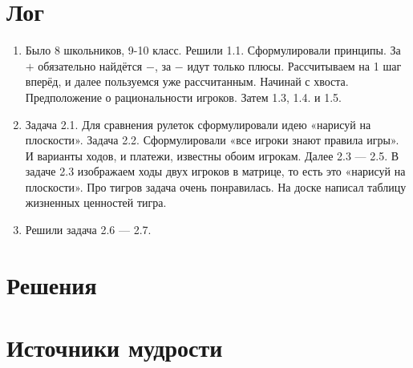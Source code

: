 \documentclass[12pt]{article}
\newcounter{problem}[section]
\begin{document}
\section{Лог}

\begin{enumerate}
  \item Было 8 школьников, 9-10 класс. Решили 1.1. Сформулировали принципы.
  За $+$ обязательно найдётся $-$, за $-$ идут только плюсы.
  Рассчитываем на 1 шаг вперёд, и далее пользуемся уже рассчитанным.
  Начинай с хвоста. Предположение о рациональности игроков.  Затем 1.3, 1.4. и 1.5.
  \item Задача 2.1. Для сравнения рулеток сформулировали идею «нарисуй на плоскости».
  Задача 2.2. Сформулировали «все игроки знают правила игры». И варианты
  ходов, и платежи, известны обоим игрокам. Далее 2.3 — 2.5.
  В задаче 2.3 изображаем ходы двух игроков в матрице, то есть это
  «нарисуй на плоскости». Про тигров задача очень понравилась. На доске написал
  таблицу жизненных ценностей тигра.
  \item Решили задача 2.6 — 2.7.
\end{enumerate}




\renewenvironment{solution}[1]{%
         \vskip .5cm plus 2cm minus 0.1cm%
         {\bfseries \hyperlink{problem:#1}{#1.}}%
}%
{%
}%

\section{Решения}


\section{Источники мудрости}
\printbibliography[heading=none]
\end{document}
